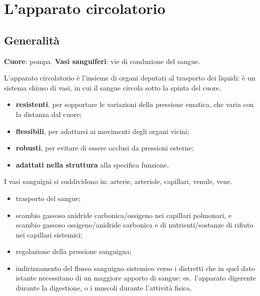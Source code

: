 \chapter{L'apparato circolatorio}

\section{Generalità}

\textbf{Cuore}: pompa. \textbf{Vasi sanguiferi}: vie di conduzione del sangue.

L'apparato circolatorio è l'insieme di organi deputati al trasporto dei liquidi: è un sistema
chiuso di vasi, in cui il sangue circola sotto la spinta del cuore.

\begin{itemize}
  \item \textbf{resistenti}, per sopportare le variazioni della pressione ematica, che varia con
    la distanza dal cuore;
  \item \textbf{flessibili}, per adattarsi ai movimenti degli organi vicini;
  \item \textbf{robusti}, per evitare di essere occlusi da pressioni esterne;
  \item \textbf{adattati nella struttura} alla specifica funzione.
\end{itemize}

I vasi sanguigni si suddividono in: arterie, arteriole, capillari, venule, vene.

\begin{itemize}
  \item trasporto del sangue;
  \item scambio gassoso anidride carbonica/ossigeno nei capillari polmonari, e scambio gassoso
    ossigeno/anidride carbonica e di nutrienti/sostanze di rifiuto nei capillari sistemici;
  \item regolazione della pressione sanguigna;
  \item indirizzamento del flusso sanguigno sistemico verso i distretti che in quel dato istante
    necessitano di un maggiore apporto di sangue: es.\ l'apparato digerente durante la digestione,
    o i muscoli durante l'attività fisica.
\end{itemize}

